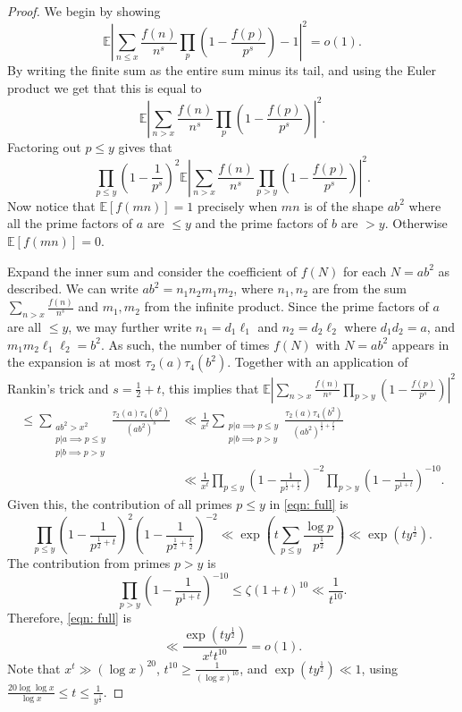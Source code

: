\documentclass[12pt]{amsart}
\def\E{\mathbb E}
\theoremstyle{remark}
\theoremstyle{definition}
\theoremstyle{remark}
\numberwithin{equation}{section}
\begin{document}
\begin{proof}
We begin by showing
$$
\mathbb{E} \left| \sum_{n \leq x} \frac{f(n)}{n^s}  \prod_p \left( 1 - \frac{f(p)}{p^s} \right) -1\right|^2 =o(1).
$$
By writing the finite sum as the entire sum minus its tail, and using the Euler product we get that this is equal to
$$\mathbb{E} \left| \sum_{n > x} \frac{f(n)}{n^s}  \prod_{p} \left( 1 - \frac{f(p)}{p^s} \right) \right|^2.$$ 
    Factoring out $p \le y$ gives that
\begin{equation}\label{eqn: full}
    \prod_{p \le y} \left(1  - \frac{1}{p^s}\right)^2\mathbb{E} \left| \sum_{n > x} \frac{f(n)}{n^s}  \prod_{p>y} \left( 1 - \frac{f(p)}{p^s} \right) \right|^2.    
    \end{equation}
Now notice that $\E[f(mn)]=1$ precisely when $mn$ is of the shape $ab^2$ where all the prime factors of $a$ are $\le y$ and the prime factors of $b$ are $>y$. Otherwise $\E[f(mn)] = 0$.
    
    Expand the inner sum and consider the coefficient of $f(N)$ for each $N = ab^2$ as described. We can write $ab^2=n_1n_2m_1m_2$, where $n_1,n_2$ are from the sum $\sum_{n>x}\frac{f(n)}{n^{s}}$ and $m_1,m_2$ from the infinite product. Since the prime factors of $a$ are all $\le y$, we may further write $n_1=d_1\ell_1$ and $n_2=d_2\ell_2$ where $d_1d_2=a$, and $m_1m_2\ell_1\ell_2=b^2$. As such, the number of times $f(N)$ with $N=ab^2$ appears in the expansion is at most $\tau_2(a)\tau_4(b^2)$.
Together with an application of Rankin's trick and $s = \frac{1}{2}+t$, this implies that  $\mathbb{E} \left| \sum_{n > x} \frac{f(n)}{n^s}  \prod_{p>y} \left( 1 - \frac{f(p)}{p^s} \right) \right|^2$
\begin{equation*}
    \begin{split}
    \le \sum_{\substack{ab^2>x^2 \\ p|a \implies p\le y\\ p|b \implies p>y}} \frac{\tau_2(a)\tau_4(b^2)}{(ab^2)^s} &\ll \frac{1}{x^t}\sum_{\substack{p|a \implies p\le y\\ p|b \implies p>y}} \frac{\tau_2(a)\tau_4(b^2)}{(ab^2)^{\frac{1}{2}+\frac{t}{2}}} \\ & \ll \frac{1}{x^t}\prod_{p \le y} \left(1-\frac{1}{p^{\frac{1}{2}+\frac{t}{2}}}\right)^{-2} \prod_{p>y} \left(1-\frac{1}{p^{1+t}}\right)^{-10}.     
    \end{split}
\end{equation*}
    Given this, the contribution of all primes $p \le y$ in \eqref{eqn: full} is 
    $$\prod_{p \le y} \left(1  - \frac{1}{p^{\frac{1}{2}+t}}\right)^2\left(1-\frac{1}{p^{\frac{1}{2}+\frac{t}{2}}}\right)^{-2} \ll \exp \left(t\sum_{p \le y} \frac{\log p}{p^{\frac{1}{2}}}\right) \ll \exp(t y^{\frac{1}{2}}).$$
 The contribution from primes $p>y$ is 
    $$\prod_{p>y} \left(1-\frac{1}{p^{1+t}}\right)^{-10} \le \zeta(1+t)^{10} \ll \frac{1}{t ^{10}}.$$
    Therefore, \eqref{eqn: full} is 
    $$\ll \frac{\exp(ty^{\frac{1}{2}})}{x^{t}t^{10}}=o(1).$$
    Note that $x^{t} \gg (\log x)^{20}$, $t^{10} \ge \frac{1}{(\log x)^{10}}$, and $\exp(ty^{\frac{1}{2}}) \ll 1$,  using $\frac{20\log \log x}{\log x}\le t \le \frac{1}{y^{\frac{1}{2}}}$.


\end{proof}
\end{document}
